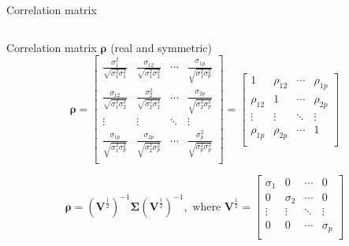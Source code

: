 \documentclass[ignorenonframetext,]{beamer}
\begin{document}
\begin{frame}

\begin{block}{Correlation matrix}

\(~\)

Correlation matrix \(\boldsymbol{\rho}\) (real and symmetric)
\[\boldsymbol{\rho}=\left[ \begin{array}{cccc}
    \frac{\sigma_{1}^2}{\sqrt{\sigma_{1}^2\sigma_{1}^2}} &
    \frac{\sigma_{12}}{\sqrt{\sigma_{1}^2\sigma_{2}^2}} &
    \cdots &
    \frac{\sigma_{1p}}{\sqrt{\sigma_{1}^2\sigma_{p}^2}}\\
    \frac{\sigma_{12}}{\sqrt{\sigma_{1}^2\sigma_{2}^2}} &
    \frac{\sigma_{2}^2}{\sqrt{\sigma_{2}^2\sigma_{2}^2}} &
    \cdots &
    \frac{\sigma_{2p}}{\sqrt{\sigma_{2}^2\sigma_{p}^2}}\\
    \vdots & \vdots & \ddots & \vdots\\
      \frac{\sigma_{1p}}{\sqrt{\sigma_{1}^2\sigma_{p}^2}} &
    \frac{\sigma_{2p}}{\sqrt{\sigma_{2}^2\sigma_{p}^2}} &
    \cdots &
    \frac{\sigma_{p}^2}{\sqrt{\sigma_{p}^2\sigma_{p}^2}}\\ \end{array}\right]=
 \left[ \begin{array}{cccc}
    1 & \rho_{12} & \cdots & \rho_{1p}\\
    \rho_{12} & 1 & \cdots & \rho_{2p}\\
    \vdots & \vdots & \ddots & \vdots\\
    \rho_{1p} & \rho_{2p} & \cdots & 1\\
\end{array}\right]\]

\[\boldsymbol{\rho}=(\boldsymbol{V}^{\frac{1}{2}})^{-1}
    \boldsymbol\Sigma(\boldsymbol{V}^{\frac{1}{2}})^{-1}, \text{   where    }
   \boldsymbol{V}^{\frac{1}{2}}=
 \left[ \begin{array}{cccc}
    \sigma_{1} & 0& \cdots & 0\\
    0 &  \sigma_{2}  & \cdots & 0\\
    \vdots & \vdots & \ddots & \vdots\\
    0 & 0 & \cdots &  \sigma_{p} \\
\end{array} \right]\]

\end{block}

\end{frame}
\end{document}

